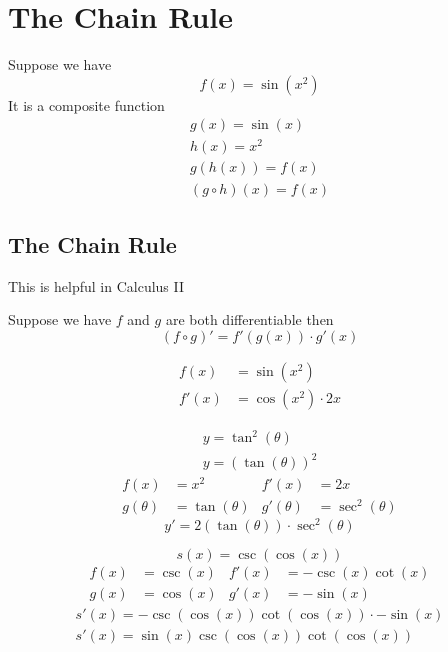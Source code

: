 
\section{The Chain Rule}
Suppose we have
\begin{equation*}
    f(x) = \sin(x^2)
\end{equation*}
It is a composite function
\begin{gather*}
    g(x) = \sin(x) \\
    h(x) = x^2 \\
    g(h(x)) = f(x) \\
    (g \circ h)(x) = f(x)
\end{gather*}
\subsection{The Chain Rule}
\begin{note}
    This is helpful in Calculus II
\end{note}
\begin{theorem}
    Suppose we have $f$ and $g$ are both differentiable then
    \begin{equation}
        \left(f \circ g\right)' = f'(g(x)) \cdot g'(x)
    \end{equation}
\end{theorem}
\begin{example}
    \begin{align*}
        f(x) &= \sin(x^2) \\
        f'(x) &= \cos(x^2) \cdot 2x
    \end{align*}
\end{example}
\begin{example}
    \begin{gather*}
        y = \tan^2(\theta) \\
        y = \left(\tan(\theta)\right)^2
    \end{gather*}
    \begin{align*}
        f(x)      &= x^2          & f'(x)      &= 2x \\
        g(\theta) &= \tan(\theta) & g'(\theta) &= \sec^2(\theta)
    \end{align*}
    \begin{equation*}
        y' = 2\left(\tan(\theta)\right) \cdot \sec^2(\theta)
    \end{equation*}
\end{example}
\begin{example}
    \begin{equation*}
        s(x) = \csc(\cos(x))
    \end{equation*}
    \begin{align*}
        f(x) &= \csc(x) & f'(x) &= -\csc(x)\cot(x) \\
        g(x) &= \cos(x) & g'(x) &= -\sin(x)
    \end{align*}
    \begin{gather*}
        s'(x) = -\csc(\cos(x))\cot(\cos(x)) \cdot -\sin(x) \\
        s'(x) = \sin(x)\csc(\cos(x))\cot(\cos(x))
    \end{gather*}
\end{example}
